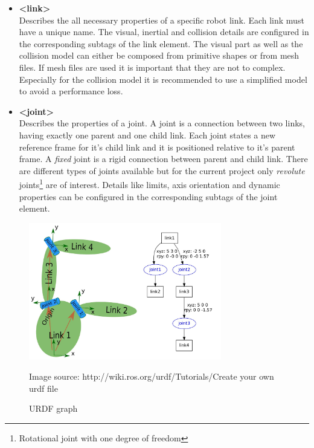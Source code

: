 \begin{itemize}

\item \textbf{<link>} \\
Describes the all necessary properties of a specific robot link. Each link must have a unique name. The visual, inertial and collision details are configured in the corresponding subtags of the link element. The visual part as well as the collision model can either be composed from primitive shapes
or from mesh files. If mesh files are used it is important that they are not to complex. Especially for the collision model it is recommended to use a simplified model to avoid a performance loss.

\item \textbf{<joint>} \\
Describes the properties of a joint. A joint is a connection between two links, having exactly one parent and one child link. Each joint states a new reference frame for it's child link and it is positioned relative to it's parent frame. A \emph{fixed} joint is a rigid connection between parent and child link. There are different types of joints available but for the current project only \emph{revolute} joints\footnote{Rotational joint with one degree of freedom} are of interest. Details like limits, axis orientation and dynamic properties can be configured in the corresponding subtags of the joint element.

\end{itemize}
\begin{figure}[ht]
	\centering
  	\includegraphics[width=0.75\textwidth]{images/urdf_chain.jpg}
	\caption[URDF graph]{URDF graph}
	{\scriptsize Image source: http://wiki.ros.org/urdf/Tutorials/Create your own urdf file}
	\label{fig:urdf_graph}
\end{figure}
